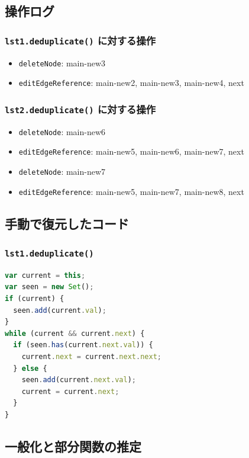 \documentclass{article}
\begin{document}
\subsection{操作ログ}

\subsubsection{\texttt{lst1.deduplicate()} に対する操作}
\begin{itemize}
  \item \texttt{deleteNode}: main-new3
  \item \texttt{editEdgeReference}: main-new2, main-new3, main-new4, next
\end{itemize}

\subsubsection{\texttt{lst2.deduplicate()} に対する操作}
\begin{itemize}
  \item \texttt{deleteNode}: main-new6
  \item \texttt{editEdgeReference}: main-new5, main-new6, main-new7, next
  \item \texttt{deleteNode}: main-new7
  \item \texttt{editEdgeReference}: main-new5, main-new7, main-new8, next
\end{itemize}

\subsection{手動で復元したコード}

\subsubsection{\texttt{lst1.deduplicate()}}
\begin{lstlisting}[language=JavaScript]
var current = this;
var seen = new Set();
if (current) {
  seen.add(current.val);
}
while (current && current.next) {
  if (seen.has(current.next.val)) {
    current.next = current.next.next;
  } else {
    seen.add(current.next.val);
    current = current.next;
  }
}
\end{lstlisting}

\subsection{一般化と部分関数の推定}
\end{document}
